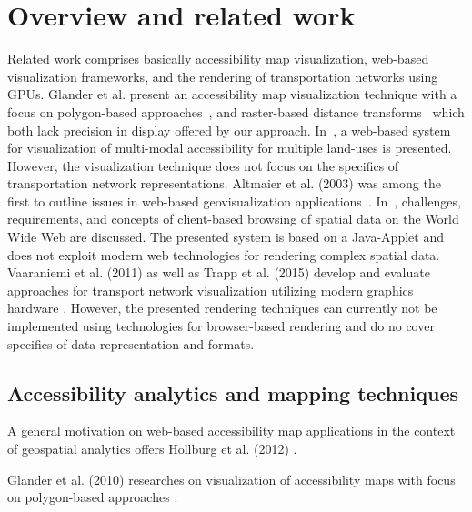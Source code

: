
\cleardoublepage              %
\chapter{Overview and related work}
  \label{chap:overv}
  Related work comprises basically accessibility map visualization, web-based
  visualization frameworks, and the rendering of transportation networks using
  GPUs. Glander et al. present an accessibility map visualization technique
  with a focus on polygon-based approaches~\cite{Glander2010}, and raster-based
  distance transforms~\cite{Mueller2010} which both lack precision in display
  offered by our approach. In~\cite{Yin2015}, a web-based system for visualization
  of multi-modal accessibility for multiple
  land-uses is presented. However, the visualization technique does not focus on the
  specifics of transportation network representations. Altmaier et al. (2003) was
  among the first to outline issues in web-based geovisualization
  applications~\cite{Altmaier2003}. In~\cite{Brabec2007}, challenges, requirements,
  and concepts of client-based browsing of spatial data on the World Wide Web are
  discussed. The presented system is based on a Java-Applet and does not exploit
  modern web technologies for rendering complex spatial data. Vaaraniemi et al. (2011)
  as well as Trapp et al. (2015) develop and evaluate approaches for transport network
  visualization utilizing modern graphics hardware \cite{Vaaraniemi2011,Trapp2015}.
  However, the presented rendering techniques can currently not be implemented
  using technologies for browser-based rendering and do no cover specifics of
  data representation and formats.\par
  \section{Accessibility analytics and mapping techniques}
    \label{sec:overv:accss}
    A general motivation on web-based accessibility map applications in the context of geospatial analytics offers Hollburg et al. (2012) \cite{hollburghier}.\par
    Glander et al. (2010) researches on visualization of accessibility maps with focus on polygon-based approaches \cite{Glander2010}.\par
